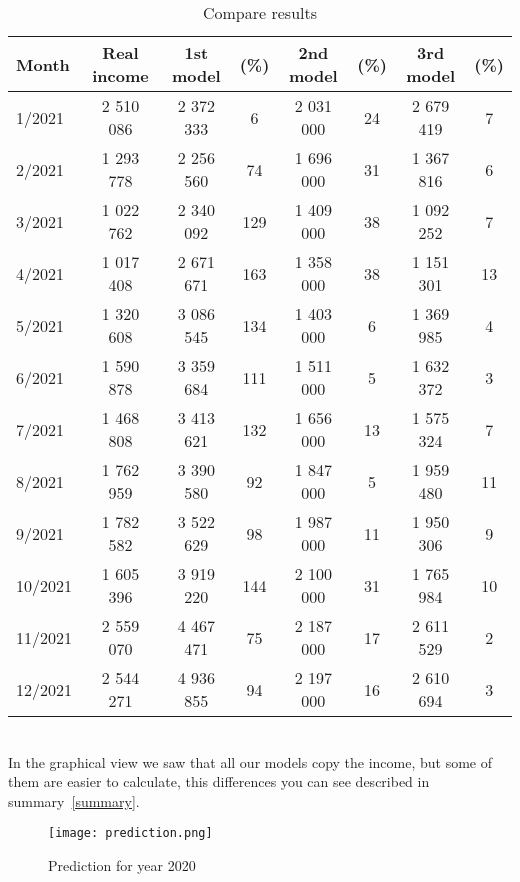 \begin{table}[h!]
    \begin{center}
        \begin{tabular}{ | l | c | c | c | c | c | c | c |}
            \hline
            {\textbf{Month}} & \textbf{Real income} & \textbf{1st model} & \textbf{(\%)}  & \textbf{2nd model} & \textbf{(\%)} & \textbf{3rd model} & \textbf{(\%)}\\
            \hline
            1/2021 & 2 510 086 & 2 372 333 & 6 & 2 031 000 & 24 & 2 679 419 & 7\\
            2/2021 & 1 293 778 & 2 256 560 & 74 & 1 696 000 & 31 & 1 367 816 & 6\\
            3/2021 & 1 022 762 & 2 340 092 & 129 & 1 409 000 & 38 & 1 092 252 & 7\\
            4/2021 & 1 017 408 & 2 671 671 & 163 & 1 358 000 & 38 & 1 151 301 & 13\\
            5/2021 & 1 320 608 & 3 086 545 & 134 & 1 403 000 & 6 & 1 369 985 & 4\\
            6/2021 & 1 590 878 & 3 359 684 & 111 & 1 511 000 & 5 & 1 632 372 & 3\\
            7/2021 & 1 468 808 & 3 413 621 & 132 & 1 656 000 & 13 & 1 575 324 & 7\\
            8/2021 & 1 762 959 & 3 390 580 & 92 & 1 847 000 & 5 & 1 959 480 & 11\\
            9/2021 & 1 782 582 & 3 522 629 & 98 & 1 987 000 & 11 & 1 950 306 & 9\\
            10/2021 & 1 605 396 & 3 919 220 & 144 & 2 100 000 & 31 & 1 765 984 & 10\\
            11/2021 & 2 559 070 & 4 467 471 & 75 & 2 187 000 & 17 & 2 611 529 & 2\\
            12/2021 & 2 544 271 & 4 936 855 & 94 & 2 197 000 & 16 & 2 610 694 & 3\\
            \hline
        \end{tabular}
    \end{center}
    \caption{Compare results}
    \label{Compare results}
\end{table}\\
In the graphical view we saw that all our models copy the income, but some of them are easier to calculate, this differences you can see described in summary~\ref{summary}.
\begin{figure}[h!]
    \begin{center}
        \texttt{[image: prediction.png]}
    \end{center}
    \caption{Prediction for year 2020}
    \label{prediction}
\end{figure}\\
